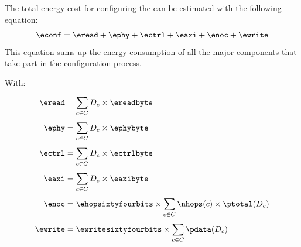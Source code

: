 

The total energy cost for configuring the \graicore{} can be estimated with the following equation:
\begin{equation}
    \econf = \eread + \ephy + \ectrl + \eaxi + \enoc + \ewrite
\end{equation}
This equation sums up the energy consumption of all the major components that take part in the configuration process.

With:
\begin{align*} 
\eread &= 
    \sum_{c \in C}^{} D_c \times \ereadbyte \\
\ephy &=
    \sum_{c \in C}^{} D_c \times \ephybyte \\
\ectrl &=
    \sum_{c \in C}^{} D_c \times \ectrlbyte \\
\eaxi &=
    \sum_{c \in C}^{} D_c \times \eaxibyte \\
\enoc &=
    \ehopsixtyfourbits \times \sum_{c \in C}^{}{\nhops(c) \times \ptotal(D_c)} \\
\ewrite &=
    \ewritesixtyfourbits \times \sum_{c \in C}^{}{\pdata(D_c)}
\end{align*}

